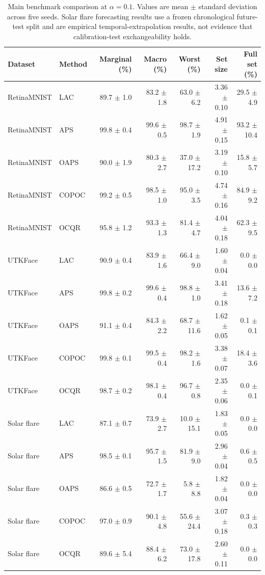 \documentclass[conference]{IEEEtran}
\begin{document}
\begin{table}[t]
\centering
\caption{Main benchmark comparison at $\alpha=0.1$. Values are mean $\pm$
standard deviation across five seeds. Solar flare forecasting results use a frozen
chronological future-test split and are empirical temporal-extrapolation
results, not evidence that calibration-test exchangeability holds.}
\label{tab:main_benchmark_results}
\begin{tabular}{llrrrrr}
\toprule
Dataset & Method & Marginal (\%) & Macro (\%) & Worst (\%) & Set size & Full set (\%) \\
\midrule
RetinaMNIST & LAC   & 89.7 $\pm$ 1.0 & 83.2 $\pm$ 1.8 & 63.0 $\pm$ 6.2 & 3.36 $\pm$ 0.10 & 29.5 $\pm$ 4.9 \\
RetinaMNIST & APS   & 99.8 $\pm$ 0.4 & 99.6 $\pm$ 0.5 & 98.7 $\pm$ 1.9 & 4.91 $\pm$ 0.15 & 93.2 $\pm$ 10.4 \\
RetinaMNIST & OAPS  & 90.0 $\pm$ 1.9 & 80.3 $\pm$ 2.7 & 37.0 $\pm$ 17.2 & 3.19 $\pm$ 0.10 & 15.8 $\pm$ 5.7 \\
RetinaMNIST & COPOC & 99.2 $\pm$ 0.5 & 98.5 $\pm$ 1.0 & 95.0 $\pm$ 3.5 & 4.74 $\pm$ 0.16 & 84.9 $\pm$ 9.2 \\
RetinaMNIST & OCQR  & 95.8 $\pm$ 1.2 & 93.3 $\pm$ 1.3 & 81.4 $\pm$ 4.7 & 4.04 $\pm$ 0.18 & 62.3 $\pm$ 9.5 \\
\midrule
UTKFace & LAC   & 90.9 $\pm$ 0.4 & 83.9 $\pm$ 1.6 & 66.4 $\pm$ 9.0 & 1.60 $\pm$ 0.04 & 0.0 $\pm$ 0.0 \\
UTKFace & APS   & 99.8 $\pm$ 0.2 & 99.6 $\pm$ 0.4 & 98.8 $\pm$ 1.0 & 3.41 $\pm$ 0.18 & 13.6 $\pm$ 7.2 \\
UTKFace & OAPS  & 91.1 $\pm$ 0.4 & 84.3 $\pm$ 2.2 & 68.7 $\pm$ 11.6 & 1.62 $\pm$ 0.05 & 0.1 $\pm$ 0.1 \\
UTKFace & COPOC & 99.8 $\pm$ 0.1 & 99.5 $\pm$ 0.4 & 98.2 $\pm$ 1.6 & 3.38 $\pm$ 0.07 & 18.4 $\pm$ 3.6 \\
UTKFace & OCQR  & 98.7 $\pm$ 0.2 & 98.1 $\pm$ 0.4 & 96.7 $\pm$ 0.8 & 2.35 $\pm$ 0.06 & 0.0 $\pm$ 0.1 \\
\midrule
Solar flare & LAC   & 87.1 $\pm$ 0.7 & 73.9 $\pm$ 2.7 & 10.0 $\pm$ 15.1 & 1.83 $\pm$ 0.05 & 0.0 $\pm$ 0.0 \\
Solar flare & APS   & 98.5 $\pm$ 0.1 & 95.7 $\pm$ 1.5 & 81.9 $\pm$ 9.0 & 2.96 $\pm$ 0.04 & 0.6 $\pm$ 0.5 \\
Solar flare & OAPS  & 86.6 $\pm$ 0.5 & 72.7 $\pm$ 1.7 & 5.8 $\pm$ 8.8 & 1.82 $\pm$ 0.04 & 0.0 $\pm$ 0.0 \\
Solar flare & COPOC & 97.0 $\pm$ 0.9 & 90.1 $\pm$ 4.8 & 55.6 $\pm$ 24.4 & 3.07 $\pm$ 0.18 & 0.3 $\pm$ 0.3 \\
Solar flare & OCQR  & 89.6 $\pm$ 5.4 & 88.4 $\pm$ 6.2 & 73.0 $\pm$ 17.8 & 2.60 $\pm$ 0.11 & 0.0 $\pm$ 0.0 \\
\bottomrule
\end{tabular}
\end{table}
\end{document}
